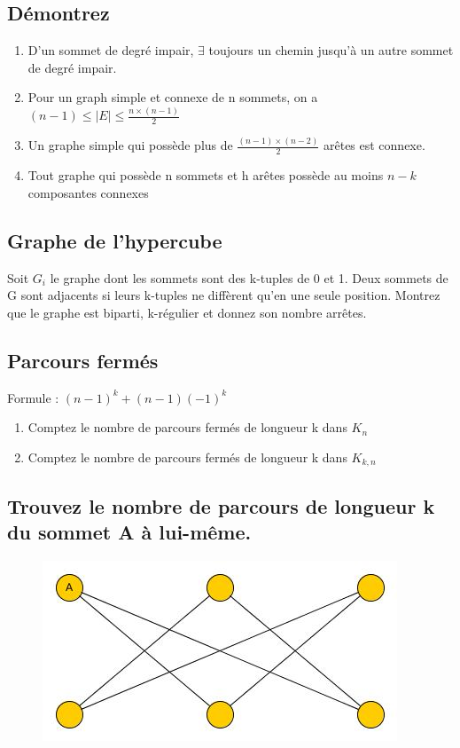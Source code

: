 \subsection{Démontrez}
\begin{enumerate}
  \item{D'un sommet de degré impair, $\exists$ toujours un chemin jusqu'à un autre sommet de degré impair.}
  \item{Pour un graph simple et connexe de n sommets, on a $(n-1) \leq |E| \leq \frac{n \times (n-1)}{2}$}
  \item{Un graphe simple qui possède plus de $\frac{(n-1) \times (n-2)}{2}$ arêtes est connexe.}
  \item{Tout graphe qui possède n sommets et h arêtes possède au moins $n-k$ composantes connexes}
\end{enumerate}

\subsection{Graphe de l'hypercube}
Soit $G_{i}$ le graphe dont les sommets sont des k-tuples de 0 et 1. Deux sommets de G sont adjacents si leurs k-tuples ne diffèrent qu'en une seule position. Montrez que le graphe est biparti, k-régulier et donnez son nombre arrêtes.

\subsection{Parcours fermés}
Formule : $(n-1)^{k} + (n-1)(-1)^{k}$
\begin{enumerate}
  \item{Comptez le nombre de parcours fermés de longueur k dans $K_{n}$}
  \item{Comptez le nombre de parcours fermés de longueur k dans $K_{k,n}$}
\end{enumerate}

\subsection{Trouvez le nombre de parcours de longueur k du sommet A à lui-même.}
\begin{figure}
  \center
  \includegraphics[scale=0.5]{graph_ape1_ex5}
\end{figure}

